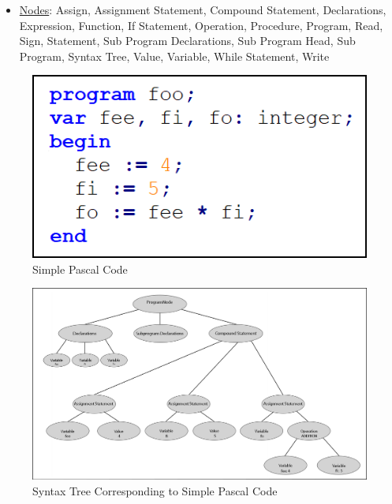 \documentclass[english]{article}
\begin{document}
\begin{itemize}
\item
\underline{Nodes}: Assign, Assignment Statement, Compound Statement, Declarations, Expression, Function, If Statement, Operation, Procedure, Program, Read, Sign, Statement, Sub Program Declarations, Sub Program Head, Sub Program, Syntax Tree, Value, Variable, While Statement, Write
\end{itemize}



\begin{figure}
\begin{center}
\includegraphics[width=.8\textwidth]{tree_code.PNG}
\end{center}
\caption{\label{Tree Code}Simple Pascal Code}
\end{figure}

\begin{figure}
\begin{center}
\includegraphics[width=1\textwidth]{syntax_tree.PNG}
\end{center}
\caption{\label{Syntax Tree}Syntax Tree Corresponding to Simple Pascal Code}
\end{figure}
\end{document}
